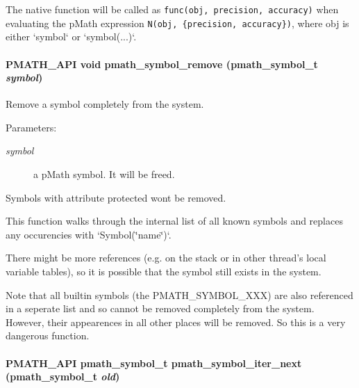 The native function will be called as {\tt func(obj, precision, accuracy)} when evaluating the pMath expression {\tt N(obj, \{precision, accuracy\})}, where obj is either `symbol` or `symbol(...)`. \hypertarget{group__symbols_g78e6e98a2973c5e2b073b885269b12e4}{
\paragraph[{pmath\_\-symbol\_\-remove}]{\setlength{\rightskip}{0pt plus 5cm}PMATH\_\-API void pmath\_\-symbol\_\-remove ({\bf pmath\_\-symbol\_\-t} {\em symbol})}\hfill}
\label{group__symbols_g78e6e98a2973c5e2b073b885269b12e4}


Remove a symbol completely from the system. 

\begin{Desc}
\item[Parameters:]
\begin{description}
\item[{\em symbol}]a pMath symbol. It will be freed.\end{description}
\end{Desc}
Symbols with attribute protected wont be removed.

This function walks through the internal list of all known symbols and replaces any occurencies with `Symbol(\char`\"{}name\char`\"{})`.

There might be more references (e.g. on the stack or in other thread's local variable tables), so it is possible that the symbol still exists in the system.

Note that all builtin symbols (the PMATH\_\-SYMBOL\_\-XXX) are also referenced in a seperate list and so cannot be removed completely from the system. However, their appearences in all other places will be removed. So this is a very dangerous function. \hypertarget{group__symbols_gaa4869d454bc3a544a5333e58381f760}{
\paragraph[{pmath\_\-symbol\_\-iter\_\-next}]{\setlength{\rightskip}{0pt plus 5cm}PMATH\_\-API {\bf pmath\_\-symbol\_\-t} pmath\_\-symbol\_\-iter\_\-next ({\bf pmath\_\-symbol\_\-t} {\em old})}\hfill}
\label{group__symbols_gaa4869d454bc3a544a5333e58381f760}


